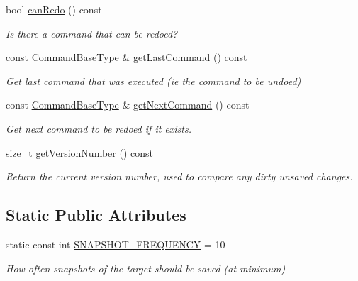 \begin{DoxyCompactItemize}
bool \mbox{\hyperlink{classpepr3d_1_1_command_manager_a2ae3625cc0baac8bb27f659ee0182eff}{can\+Redo}} () const
\begin{DoxyCompactList}\small\item\em Is there a command that can be redoed? \end{DoxyCompactList}\item 
const \mbox{\hyperlink{classpepr3d_1_1_command_base}{Command\+Base\+Type}} \& \mbox{\hyperlink{classpepr3d_1_1_command_manager_a1dc9b90a3f5a6f14502999187a9d45ef}{get\+Last\+Command}} () const
\begin{DoxyCompactList}\small\item\em Get last command that was executed (ie the command to be undoed) \end{DoxyCompactList}\item 
const \mbox{\hyperlink{classpepr3d_1_1_command_base}{Command\+Base\+Type}} \& \mbox{\hyperlink{classpepr3d_1_1_command_manager_ab5767a90a4f309d166210a8e43dec560}{get\+Next\+Command}} () const
\begin{DoxyCompactList}\small\item\em Get next command to be redoed if it exists. \end{DoxyCompactList}\item 
\mbox{\label{classpepr3d_1_1_command_manager_a95e84353863839ebded5131aef0c06b9}} 
size\+\_\+t \mbox{\hyperlink{classpepr3d_1_1_command_manager_a95e84353863839ebded5131aef0c06b9}{get\+Version\+Number}} () const
\begin{DoxyCompactList}\small\item\em Return the current version number, used to compare any dirty unsaved changes. \end{DoxyCompactList}\end{DoxyCompactItemize}
\subsection*{Static Public Attributes}
\begin{DoxyCompactItemize}
\item 
\mbox{\label{classpepr3d_1_1_command_manager_ae889dad593d812deb65c56c07a32bfdb}} 
static const int \mbox{\hyperlink{classpepr3d_1_1_command_manager_ae889dad593d812deb65c56c07a32bfdb}{S\+N\+A\+P\+S\+H\+O\+T\+\_\+\+F\+R\+E\+Q\+U\+E\+N\+CY}} = 10
\begin{DoxyCompactList}\small\item\em How often snapshots of the target should be saved (at minimum) \end{DoxyCompactList}\end{DoxyCompactItemize}
